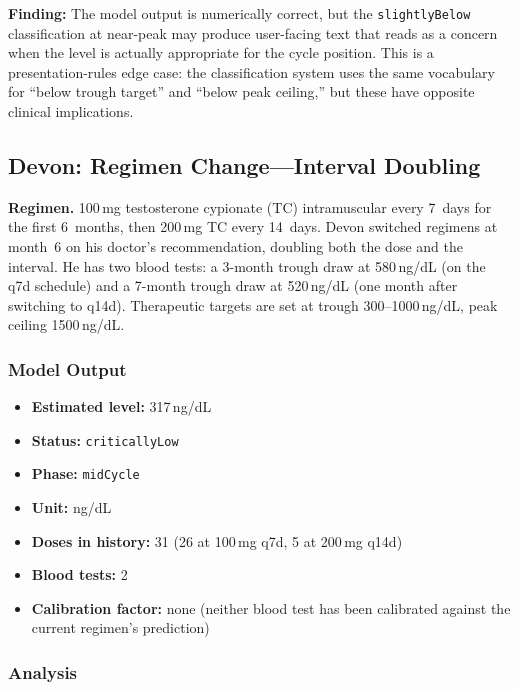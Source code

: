 \documentclass[11pt,a4paper]{article}
\newcommand{\code}[1]{\texttt{\small #1}}
\begin{document}
\textbf{Finding:} The model output is numerically correct, but the
\code{slightlyBelow} classification at near-peak may produce user-facing
text that reads as a concern when the level is actually appropriate for the
cycle position. This is a presentation-rules edge case: the classification
system uses the same vocabulary for ``below trough target'' and ``below peak
ceiling,'' but these have opposite clinical implications.

\subsection{Devon: Regimen Change---Interval Doubling}
\label{sec:devon}

\textbf{Regimen.} 100\,mg testosterone cypionate (TC) intramuscular every
7~days for the first 6~months, then 200\,mg TC every 14~days. Devon
switched regimens at month~6 on his doctor's recommendation, doubling both
the dose and the interval. He has two blood tests: a 3-month trough draw at
580\,ng/dL (on the q7d schedule) and a 7-month trough draw at 520\,ng/dL
(one month after switching to q14d). Therapeutic targets are set at trough
300--1000\,ng/dL, peak ceiling 1500\,ng/dL.

\subsubsection{Model Output}

\begin{itemize}[nosep,leftmargin=1.4em]
\item \textbf{Estimated level:} 317\,ng/dL
\item \textbf{Status:} \code{criticallyLow}
\item \textbf{Phase:} \code{midCycle}
\item \textbf{Unit:} ng/dL
\item \textbf{Doses in history:} 31 (26 at 100\,mg q7d, 5 at 200\,mg q14d)
\item \textbf{Blood tests:} 2
\item \textbf{Calibration factor:} none (neither blood test has been
  calibrated against the current regimen's prediction)
\end{itemize}

\subsubsection{Analysis}
\end{document}
